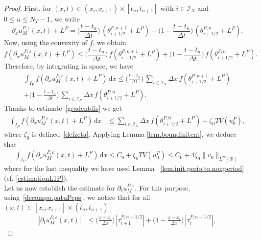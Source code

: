 \documentclass[10pt,a4paper]{amsart}
\newcommand{\I}{\mathcal{I}_N}
\newcommand{\R}{\mathbb{R}}
\newcommand{\dd}{\mathrm{d}}
\newcommand{\eps}{\varepsilon}
\newcommand{\pa}{\partial}
\begin{document}
\begin{proof}
First, for $(x,t)\in(x_i,x_{i+1})\times[t_n,t_{n+1}]$ with $i\in \I$ and $0\le n \le N_T-1$, we write
\begin{equation}\label{uepsilonx + L}
\partial_x u^{P, \eps}_M(x,t)  + L^P=  \bigg(\frac{t - t_n}{\Delta t}\bigg) \, \left(\theta_{i +1/2}^{P, n + 1} + L^P\right) + \bigg(1 - \frac{t - t_n}{\Delta t}\bigg) \, \left(\theta_{i +1/2}^{P, n }+ L^P\right). 
\end{equation}
Now, using the convexity of $f$, we obtain
\[
f\left(\partial_x u^{P, \eps}_M(x,t)+L^P \right) \leq \bigg(\frac{t - t_n}{\Delta t}\bigg) \, f\left(\theta_{i +1/2} ^{P, n + 1} + L^P\right)+ \bigg(1 - \frac{t - t_n}{\Delta t}\bigg) \, f\left(\theta_{i +1/2}^{P, n }+ L^P\right).
\]
Therefore, by integrating in space, we have
\begin{multline*}
\int_{I_P} f\left(\partial_x u^{P, \eps}_M(x,t)+L^P \right)\, \dd x \leq \bigg(\frac{t - t_n}{\Delta t}\bigg) \, \sum_{i\in\I} \Delta x\, f\left(\theta^{P,n+1}_{i+1/2}+L^P\right)\\
+ \bigg(1 - \frac{t - t_n}{\Delta t}\bigg) \, \sum_{i\in\I} \Delta x \, f\left(\theta^{P,n}_{i+1/2}+L^P\right).
\end{multline*}
Thanks to estimate~\eqref{gradentdis} we get
\begin{align*}
\int_{I_P} f\left(\partial_x u^{P, \eps}_M(x,t)+L^P \right)\, \dd x &\leq \sum_{i\in\I} \Delta x \, f\left(\theta^{P,0}_{i+1/2}+L^P\right) + \zeta_0 TV(u^P_0), 
\end{align*}
where $\zeta_0$ is defined~\eqref{defzeta}. Applying Lemma \ref{lem.boundinitent}, we deduce that 
\begin{align*}
   \int_{I_P} f\left(\partial_x u^{P, \eps}_M(x,t)+L^P \right)\, \dd x 
   \leq C_0 + \zeta_0  TV(u^P_0)
   \le C_0 + 4\zeta_0  \|v_0\|_{L^\infty(\R)}
\end{align*}
where for the last inequality we have used Lemma~ \ref{lem.init.perio.to.nonperiod} (cf. \eqref{estimationL1P}).\\
 Let us now establish the estimate for $\pa_t u^{P,\eps}_M$. For this purpose, using~\eqref{decompo.patuPeps}, we notice that for all $(x,t) \in [x_i,x_{i+1}]\times(t_n,t_{n+1})$
\begin{align*}
      \left|\partial_t u^{P, \eps}_M(x,t)\right| &\leq \bigg(\frac{x - x_i}{\Delta x}\bigg) \,\left|\tau_{i + 1}^{P, n + 1/2}\right| + \bigg( 1 - \frac{x - x_i}{\Delta x}\bigg) \, \left|\tau_{i } ^{P, n +1/2}\right|,
\end{align*}

\end{proof}
\end{document}
